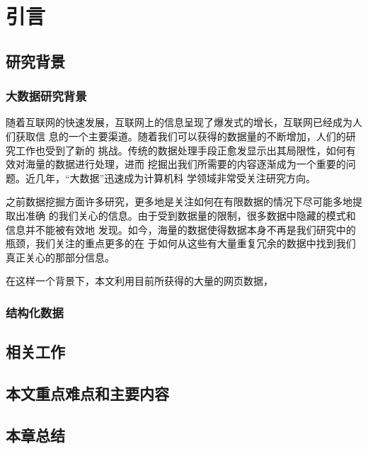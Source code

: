 
\chapter{引言}
\label{chap:intro}

\section{研究背景}
\label{sec:background}
\subsection{大数据研究背景}
随着互联网的快速发展，互联网上的信息呈现了爆发式的增长，互联网已经成为人们获取信
息的一个主要渠道。随着我们可以获得的数据量的不断增加，人们的研究工作也受到了新的
挑战。传统的数据处理手段正愈发显示出其局限性，如何有效对海量的数据进行处理，进而
挖掘出我们所需要的内容逐渐成为一个重要的问题。近几年，“大数据”迅速成为计算机科
学领域非常受关注研究方向。

之前数据挖掘方面许多研究，更多地是关注如何在有限数据的情况下尽可能多地提取出准确
的我们关心的信息。由于受到数据量的限制，很多数据中隐藏的模式和信息并不能被有效地
发现。如今，海量的数据使得数据本身不再是我们研究中的瓶颈，我们关注的重点更多的在
于如何从这些有大量重复冗余的数据中找到我们真正关心的那部分信息。

在这样一个背景下，本文利用目前所获得的大量的网页数据，

\subsection{结构化数据}
\label{sec:structuredata}


\section{相关工作}
\label{sec:relatedwork}

\section{本文重点难点和主要内容}
\label{sec:mainwork}

\section{本章总结}
\label{sec:summaryintro}


